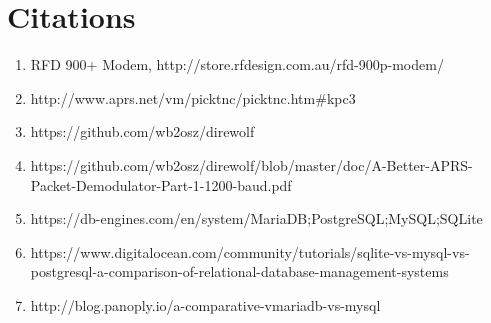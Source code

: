 \documentclass[onecolumn, draftclsnofoot, 10pt, compsoc]{IEEEtran}
\begin{document}
\section{Citations}
\begin{enumerate}
	\item RFD 900+ Modem, http://store.rfdesign.com.au/rfd-900p-modem/
	\item http://www.aprs.net/vm/picktnc/picktnc.htm\#kpc3
    \item https://github.com/wb2osz/direwolf
    \item https://github.com/wb2osz/direwolf/blob/master/doc/A-Better-APRS-Packet-Demodulator-Part-1-1200-baud.pdf
	\item https://db-engines.com/en/system/MariaDB;PostgreSQL;MySQL;SQLite
    \item https://www.digitalocean.com/community/tutorials/sqlite-vs-mysql-vs-postgresql-a-comparison-of-relational-database-management-systems
    \item http://blog.panoply.io/a-comparative-vmariadb-vs-mysql
\end{enumerate}
\end{document}
